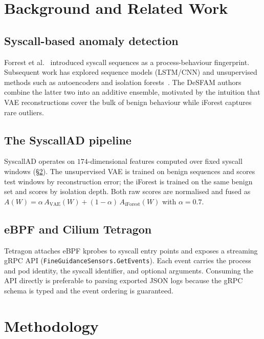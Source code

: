 \FloatBarrier
\section{Background and Related Work}
\label{sec:background}

\subsection{Syscall-based anomaly detection}
Forrest et al.~\cite{forrest1996} introduced syscall sequences as a
process-behaviour fingerprint. Subsequent work has explored sequence
models (LSTM/CNN) and unsupervised methods such as autoencoders and
isolation forests~\cite{ref38_nimos,ref27_optimus}. The DeSFAM authors
combine the latter two into an additive ensemble, motivated by the
intuition that VAE reconstructions cover the bulk of benign behaviour
while iForest captures rare outliers.

\subsection{The SyscallAD pipeline}
SyscallAD operates on $174$-dimensional features computed over fixed
syscall windows (\S\ref{sec:methodology}). The unsupervised VAE is
trained on benign sequences and scores test windows by reconstruction
error; the iForest is trained on the same benign set and scores by
isolation depth. Both raw scores are normalised and fused as
$A(W) = \alpha\,A_{\text{VAE}}(W) + (1-\alpha)\,A_{\text{iForest}}(W)$
with $\alpha=0.7$.

\subsection{eBPF and Cilium Tetragon}
Tetragon attaches eBPF kprobes to syscall entry points and exposes a
streaming gRPC API (\texttt{FineGuidanceSensors.GetEvents}). Each event
carries the process and pod identity, the syscall identifier, and
optional arguments. Consuming the API directly is preferable to
parsing exported JSON logs because the gRPC schema is typed and the
event ordering is guaranteed.

\FloatBarrier
\section{Methodology}
\label{sec:methodology}

